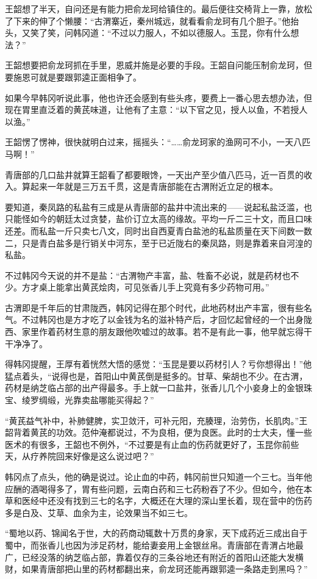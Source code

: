 王韶想了半天，自问还是有能力把俞龙珂给镇住的。最后便往交椅背上一靠，放松了下来的伸了个懒腰：“古渭寨近，秦州城远，就看看俞龙珂有几个胆子。”他抬头，又笑了笑，问韩冈道：“不过以力服人，不如以德服人。玉昆，你有什么想法？”

王韶想要把俞龙珂抓在手里，恩威并施是必要的手段。王韶自问能压制俞龙珂，但要施恩可就是要跟郭逵正面相争了。

如果今早韩冈听说此事，他也许还会感到有些头疼，要费上一番心思去想办法，但现在胃里直泛着的黄芪味道，让他有了主意：“以下官之见，授人以鱼，不若授人以渔。”

王韶愣了愣神，很快就明白过来，摇摇头：“……俞龙珂家的渔网可不小，一天八匹马啊！”

青唐部的几口盐井就算王韶看了都要眼馋，一天出产至少值八匹马，近一百贯的收入。算起来一年就是三万五千贯，这是青唐部能在古渭附近立足的根本。

要知道，秦凤路的私盐有三成是从青唐部的盐井中流出来的——说起私盐泛滥，也只能怪如今的朝廷太过贪婪，盐价订立太高的缘故。平均一斤二三十文，而且口味还差。而私盐一斤只卖七八文，同时出自西夏青白盐池的私盐质量在天下间数一数二，只是青白盐多是行销关中河东，至于已近陇右的秦凤路，则是靠着来自河湟的私盐。

不过韩冈今天说的并不是盐：“古渭物产丰富，盐、牲畜不必说，就是药材也不少。方才桌上能拿出黄芪烩肉，可见张香儿手上究竟有多少药物可用。”

古渭即是千年后的甘肃陇西，韩冈记得在那个时代，此地药材出产丰富，很有些名气。不过韩冈也是方才吃了以金钱为名的滋补特产后，才回忆起曾经的一个出身陇西、家里作着药材生意的朋友跟他吹嘘过的故事。若不是有此一事，他早就忘得干干净净了。

得韩冈提醒，王厚有着恍然大悟的感觉：“玉昆是要以药材引人？亏你想得出！”他猛点着头，“说得也是，首阳山中黄芪倒是挺多的。甘草、柴胡也不少。在古渭，药材是纳芝临占部的出产得最多。手上就一口盐井，张香儿几个小妾身上的金银珠宝、绫罗绸缎，光靠卖盐哪能买得起？”

“黄芪益气补中，补肺健脾，实卫敛汗，可补元阳，充腠理，治劳伤，长肌肉。”王韶背着黄芪的功效。范仲淹都说过，不为良相，便为良医。此时的士大夫，懂一些医术的有很多，王韶也不例外，“不过要是有止血的伤药就更好了，玉昆你前些天，从疗养院回来好像是这么说过吧？”

韩冈点了点头，他的确是说过。论止血的中药，韩冈前世只知道一个三七。当年他应酬的酒喝得多了，胃有些问题，云南白药和三七药粉吞了不少。但如今，他在本草和医经中还没有找到三七的名字，大概还在大理的深山里长着，现在营中的伤药多是白及、艾草、血余为主，论效果当不如三七。

“蜀地以药、锦闻名于世，大的药商动辄数十万贯的身家，天下成药近三成出自于蜀中，而张香儿也因为涉足药材，能给妻妾用上金银丝帛。青唐部在青渭占地最广，已经没落的纳芝临占部，靠着仅存的三条谷地还有附近的首阳山还能大发横财，如果青唐部把山里的药材都翻出来，俞龙珂还能再跟郭逵一条路走到黑吗？”

